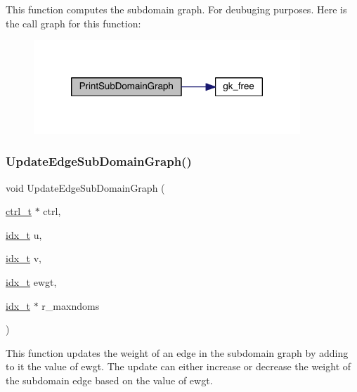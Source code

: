 This function computes the subdomain graph. For deubuging purposes. Here is the call graph for this function\+:\nopagebreak
\begin{figure}[H]
\begin{center}
\leavevmode
\includegraphics[width=284pt]{a00242_a9723ce68d6093abc3aca1086e672cde9_cgraph}
\end{center}
\end{figure}
\mbox{\label{a00242_a004451dc6b5a9ebe36a063f7bcd6495a}} 
\subsubsection{\texorpdfstring{Update\+Edge\+Sub\+Domain\+Graph()}{UpdateEdgeSubDomainGraph()}}
{\footnotesize\ttfamily void Update\+Edge\+Sub\+Domain\+Graph (\begin{DoxyParamCaption}\item[{\hyperlink{a00742}{ctrl\+\_\+t} $\ast$}]{ctrl,  }\item[{\hyperlink{a00876_aaa5262be3e700770163401acb0150f52}{idx\+\_\+t}}]{u,  }\item[{\hyperlink{a00876_aaa5262be3e700770163401acb0150f52}{idx\+\_\+t}}]{v,  }\item[{\hyperlink{a00876_aaa5262be3e700770163401acb0150f52}{idx\+\_\+t}}]{ewgt,  }\item[{\hyperlink{a00876_aaa5262be3e700770163401acb0150f52}{idx\+\_\+t} $\ast$}]{r\+\_\+maxndoms }\end{DoxyParamCaption})}

This function updates the weight of an edge in the subdomain graph by adding to it the value of ewgt. The update can either increase or decrease the weight of the subdomain edge based on the value of ewgt.


